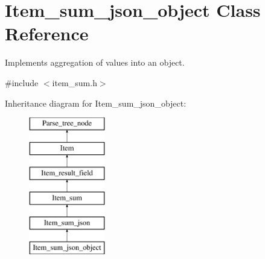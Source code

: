 \hypertarget{classItem__sum__json__object}{}\section{Item\+\_\+sum\+\_\+json\+\_\+object Class Reference}
\label{classItem__sum__json__object}


Implements aggregation of values into an object.  




{\ttfamily \#include $<$item\+\_\+sum.\+h$>$}

Inheritance diagram for Item\+\_\+sum\+\_\+json\+\_\+object\+:\begin{figure}[H]
\begin{center}
\leavevmode
\includegraphics[height=6.000000cm]{classItem__sum__json__object}
\end{center}
\end{figure}
